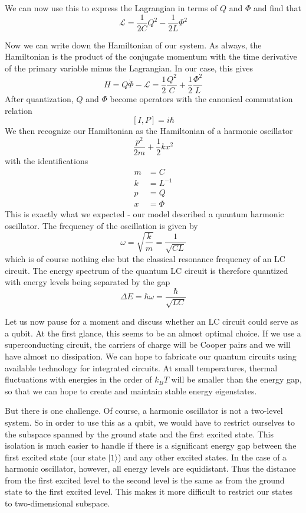 \documentclass[a4paper, draft]{article}
\theoremstyle{own}
\theoremstyle{remark}
\begin{document}
We can now use this to express the Lagrangian in terms of $Q$ and $\Phi$ and find that
$$
{\mathcal L} = \frac{1}{2C}  Q^2 - \frac{1}{2L} \Phi^2 
$$

Now we can write down the Hamiltonian of our system. As always, the Hamiltonian is the product of the conjugate momentum with the time derivative of the primary variable minus the Lagrangian. In our case, this gives
$$
H = Q\dot{\Phi} - {\mathcal L} = \frac{1}{2} \frac{Q^2}{C} + \frac{1}{2} \frac{\Phi^2}{L}
$$
After quantization, $Q$ and $\Phi$ become operators with the canonical commutation relation
$$
[I,P] = i \hbar
$$
We then recognize our Hamiltonian as the Hamiltonian of a harmonic oscillator
$$
\frac{p^2}{2m} + \frac{1}{2}kx^2
$$
with the identifications
\begin{align*}
m &= C \\
k &= L^{-1} \\
p &= Q \\
x &= \Phi
\end{align*}
This is exactly what we expected - our model described a quantum harmonic oscillator. The frequency of the oscillation is given by
$$
\omega = \sqrt{\frac{k}{m}} =  \frac{1}{\sqrt{CL}}
$$
which is of course nothing else but the classical resonance frequency of an LC circuit. The energy spectrum of the quantum LC circuit is therefore quantized with energy levels being separated by the gap
$$
\Delta E = \hbar \omega = \frac{\hbar}{\sqrt{LC}}
$$

Let us now pause for a moment and discuss whether an LC circuit could serve as a qubit. At the first glance, this seems to be an almost optimal choice. If we use a superconducting circuit, the carriers of charge will be Cooper pairs and we will have almost no dissipation. We can hope to fabricate our quantum circuits using available technology for integrated circuits. At small temperatures, thermal fluctuations with energies in the order of $k_B T$ will be smaller than the energy gap, so that we can hope to create and maintain stable energy eigenstates.

But there is one challenge. Of course, a harmonic oscillator is not a two-level system. So in order to use this as a qubit, we would have to restrict ourselves to the subspace spanned by the ground state and the first excited state. This isolation is much easier to handle if there is a significant energy gap between the first excited state (our state $|1\rangle$) and any other excited states. In the case of a harmonic oscillator, however, all energy levels are equidistant. Thus the distance from the first excited level to the second level is the same as from the ground state to the first excited level. This makes it more difficult to restrict our states to two-dimensional subspace. 
\end{document}

